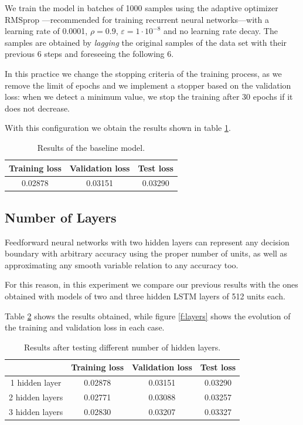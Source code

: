 \documentclass[]{article}
\begin{document}
We train the model in batches of 1000 samples using the adaptive optimizer RMSprop \cite{tieleman2012lecture}---recommended for training recurrent neural networks---with a learning rate of 0.0001, $ \rho = 0.9 $, $ \varepsilon = 1 \cdot 10^{-8} $ and no learning rate decay. The samples are obtained by \emph{lagging} the original samples of the data set with their previous 6 steps and foreseeing the following 6.

In this practice we change the stopping criteria of the training process, as we remove the limit of epochs and we implement a stopper based on the validation loss: when we detect a minimum value, we stop the training after 30 epochs if it does not decrease.

With this configuration we obtain the results shown in table \ref{t:baseline}.

\begin{table}[H]
	\centering
	\begin{tabular}{@{}ccc@{}}
		\toprule
		Training loss & Validation loss & Test loss \\ \midrule
		0.02878       & 0.03151         & 0.03290   \\ \bottomrule
	\end{tabular}
	\caption{Results of the baseline model.}
	\label{t:baseline}
\end{table}

\subsection{Number of Layers}

Feedforward neural networks with two hidden layers can represent any decision boundary with arbitrary accuracy using the proper number of units, as well as approximating any smooth variable relation to any accuracy too.

For this reason, in this experiment we compare our previous results with the ones obtained with models of two and three hidden LSTM layers of 512 units each.

Table \ref{t:layers} shows the results obtained, while figure \ref{f:layers} shows the evolution of the training and validation loss in each case.

\begin{table}[H]
	\centering
	\begin{tabular}{@{}cccc@{}}
		\toprule
		& Training loss & Validation loss & Test loss \\ \midrule
		1 hidden layer  & 0.02878       & 0.03151         & 0.03290   \\
		2 hidden layers & 0.02771       & 0.03088         & 0.03257   \\
		3 hidden layers & 0.02830       & 0.03207         & 0.03327   \\ \bottomrule
	\end{tabular}
	\caption{Results after testing different number of hidden layers.}
	\label{t:layers}
\end{table}
\end{document}
